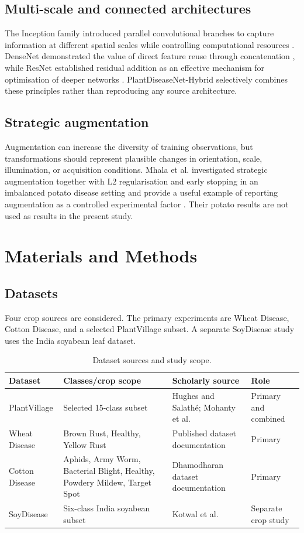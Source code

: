 \documentclass[a4paper,fleqn]{cas-dc}
\begin{document}
\subsection{Multi-scale and connected architectures}
The Inception family introduced parallel convolutional branches to capture information at different spatial scales while controlling computational resources \citep{szegedy2015}. DenseNet demonstrated the value of direct feature reuse through concatenation \citep{huang2017}, while ResNet established residual addition as an effective mechanism for optimisation of deeper networks \citep{he2016}. PlantDiseaseNet-Hybrid selectively combines these principles rather than reproducing any source architecture.

\subsection{Strategic augmentation}
Augmentation can increase the diversity of training observations, but transformations should represent plausible changes in orientation, scale, illumination, or acquisition conditions. Mhala et al. investigated strategic augmentation together with L2 regularisation and early stopping in an imbalanced potato disease setting and provide a useful example of reporting augmentation as a controlled experimental factor \citep{mhalap2025}. Their potato results are not used as results in the present study.

\section{Materials and Methods}
\subsection{Datasets}
Four crop sources are considered. The primary experiments are Wheat Disease, Cotton Disease, and a selected PlantVillage subset. A separate SoyDisease study uses the India soyabean leaf dataset.

\begin{table}[t]
\centering
\caption{Dataset sources and study scope.}
\label{tab:datasets}
\small
\begin{tabularx}{\textwidth}{@{}l l X l@{}}
\toprule
Dataset & Classes/crop scope & Scholarly source & Role \\
\midrule
PlantVillage & Selected 15-class subset & Hughes and Salathé; Mohanty et al. \citep{hughes2015,mohanty2016} & Primary and combined \\
Wheat Disease & Brown Rust, Healthy, Yellow Rust & Published dataset documentation \citep{wheatvit2022} & Primary \\
Cotton Disease & Aphids, Army Worm, Bacterial Blight, Healthy, Powdery Mildew, Target Spot & Dhamodharan dataset documentation \citep{cotton2024} & Primary \\
SoyDisease & Six-class India soyabean subset & Kotwal et al. \citep{kotwal2024} & Separate crop study \\
\bottomrule
\end{tabularx}
\end{table}
\end{document}

